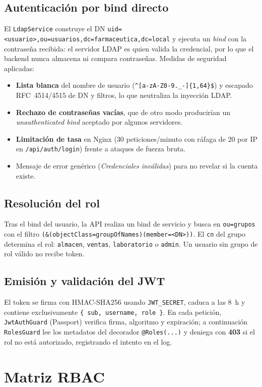 \documentclass[11pt,a4paper,oneside]{report}
\newcommand{\cod}[1]{\texttt{\small #1}}
\begin{document}
\subsection{Autenticación por bind directo}
El \cod{LdapService} construye el DN \cod{uid=<usuario>,ou=usuarios,dc=farmaceutica,dc=local}
y ejecuta un \emph{bind} con la contraseña recibida: el servidor LDAP es quien valida la
credencial, por lo que el backend nunca almacena ni compara contraseñas. Medidas de
seguridad aplicadas:
\begin{itemize}
  \item \textbf{Lista blanca} del nombre de usuario (\cod{\^{}[a-zA-Z0-9.\_-]\{1,64\}\$}) y
  escapado RFC~4514/4515 de DN y filtros, lo que neutraliza la inyección LDAP.
  \item \textbf{Rechazo de contraseñas vacías}, que de otro modo producirían un
  \emph{unauthenticated bind} aceptado por algunos servidores.
  \item \textbf{Limitación de tasa} en Nginx (30 peticiones/minuto con ráfaga de 20 por IP en
  \cod{/api/auth/login}) frente a ataques de fuerza bruta.
  \item Mensaje de error genérico (\emph{Credenciales inválidas}) para no revelar si la
  cuenta existe.
\end{itemize}

\subsection{Resolución del rol}
Tras el bind del usuario, la API realiza un bind de servicio y busca en \cod{ou=grupos}
con el filtro \cod{(\&(objectClass=groupOfNames)(member=<DN>))}. El \cod{cn} del grupo
determina el rol: \cod{almacen}, \cod{ventas}, \cod{laboratorio} o \cod{admin}. Un usuario
sin grupo de rol válido no recibe token.

\subsection{Emisión y validación del JWT}
El token se firma con HMAC-SHA256 usando \cod{JWT\_SECRET}, caduca a las \SI{8}{\hour} y
contiene exclusivamente \cod{\{ sub, username, role \}}. En cada petición,
\cod{JwtAuthGuard} (Passport) verifica firma, algoritmo y expiración; a continuación
\cod{RolesGuard} lee los metadatos del decorador \cod{@Roles(...)} y deniega con
\textbf{403} si el rol no está autorizado, registrando el intento en el log.

\section{Matriz RBAC}
\end{document}
